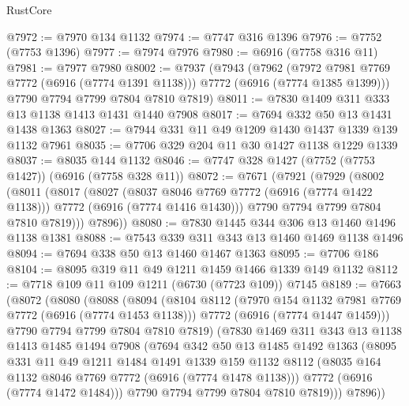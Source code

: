 \begin{lexlean}{RustCore}
\begin{coremodule}
@7972 := @7970 @134 @1132
@7974 := @7747 @316 @1396
@7976 := @7752 (@7753 @1396)
@7977 := @7974 @7976
@7980 := @6916 (@7758 @316 @11)
@7981 := @7977 @7980
@8002 := @7937
    (@7943
      (@7962
        (@7972 @7981 @7769 @7772 (@6916 (@7774 @1391 @1138)))
        @7772
        (@6916 (@7774 @1385 @1399)))
      @7790
      @7794
      @7799
      @7804
      @7810
      @7819)
@8011 := @7830 @1409 @311 @333 @13 @1138 @1413 @1431 @1440 @7908
@8017 := @7694 @332 @50 @13 @1431 @1438 @1363
@8027 := @7944 @331 @11 @49 @1209 @1430 @1437 @1339 @139 @1132 @7961
@8035 := @7706 @329 @204 @11 @30 @1427 @1138 @1229 @1339
@8037 := @8035 @144 @1132
@8046 := @7747 @328 @1427 (@7752 (@7753 @1427)) (@6916 (@7758 @328 @11))
@8072 := @7671
    (@7921
      (@7929
        (@8002
          (@8011
            (@8017
              (@8027
                (@8037 @8046 @7769 @7772 (@6916 (@7774 @1422 @1138)))
                @7772
                (@6916 (@7774 @1416 @1430)))
              @7790
              @7794
              @7799
              @7804
              @7810
              @7819)))
        @7896))
@8080 := @7830 @1445 @344 @306 @13 @1460 @1496 @1138 @1381
@8088 := @7543 @339 @311 @343 @13 @1460 @1469 @1138 @1496
@8094 := @7694 @338 @50 @13 @1460 @1467 @1363
@8095 := @7706 @186
@8104 := @8095 @319 @11 @49 @1211 @1459 @1466 @1339 @149 @1132
@8112 := @7718 @109 @11 @109 @1211 (@6730 (@7723 @109)) @7145
@8189 := @7663
    (@8072
      (@8080
        (@8088
          (@8094
            (@8104
              @8112
              (@7970 @154 @1132 @7981 @7769 @7772 (@6916 (@7774 @1453 @1138)))
              @7772
              (@6916 (@7774 @1447 @1459)))
            @7790
            @7794
            @7799
            @7804
            @7810
            @7819)
          (@7830
            @1469
            @311
            @343
            @13
            @1138
            @1413
            @1485
            @1494
            @7908
            (@7694
              @342
              @50
              @13
              @1485
              @1492
              @1363
              (@8095
                @331
                @11
                @49
                @1211
                @1484
                @1491
                @1339
                @159
                @1132
                @8112
                (@8035 @164 @1132 @8046 @7769 @7772 (@6916 (@7774 @1478 @1138)))
                @7772
                (@6916 (@7774 @1472 @1484)))
              @7790
              @7794
              @7799
              @7804
              @7810
              @7819)))
        @7896))

\end{coremodule}
\end{lexlean}
